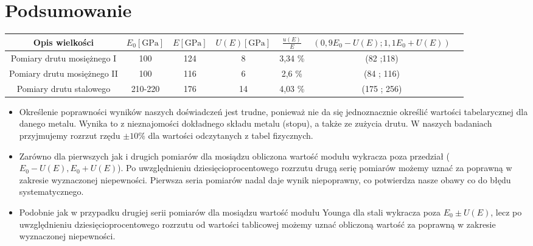 \documentclass [a4paper,11pt]{article}
\begin{document}
	
	
	\section{Podsumowanie}
	\begin{center}
		\begin{tabular}{|c|c|c|c|c|c|c|}
			\hline Opis wielkości & $ E_0 \left[ \text{GPa} \right]$ & $E \left[ \text{GPa} \right]$ & $U(E) \left[ \text{GPa} \right]$ & $ \frac{u(E)}{E} $& $(0,9E_0-U(E); 1,1E_0 + U(E))$\\
			\hline Pomiary drutu mosiężnego I & 100 & 124 & 8 & 3,34 \% & (82 ;118) \\
			\hline Pomiary drutu mosiężnego II & 100 & 116 & 6 & 2,6 \% & (84 ; 116) \\  
			\hline Pomiary drutu stalowego & 210-220 & 176  & 14 &  4,03 \% & (175 ; 256)\\ 
			\hline 
		\end{tabular} 
	\end{center}
\vspace{1em}

\begin{itemize}
	\item Określenie poprawności wyników naszych doświadczeń jest trudne, ponieważ nie da się jednoznacznie określić wartości tabelarycznej dla danego metalu. Wynika to z nieznajomości dokładnego składu metalu (stopu), a także ze zużycia drutu. W naszych badaniach przyjmujemy rozrzut rzędu $\pm10\%$ dla wartości odczytanych z tabel fizycznych.
	
	\item Zarówno dla pierwszych jak i drugich pomiarów dla mosiądzu obliczona wartość modułu wykracza poza przedział ($E_0-U(E), E_0+U(E)$). Po uwzględnieniu dziesięcioprocentowego rozrzutu drugą serię pomiarów możemy uznać za poprawną w zakresie wyznaczonej niepewności. Pierwsza seria pomiarów nadal daje wynik niepoprawny, co potwierdza nasze obawy co do błędu systematycznego.
	
	\item Podobnie jak w przypadku drugiej serii pomiarów dla mosiądzu wartość modułu Younga dla stali wykracza poza $E_0 \pm U(E)$, lecz po uwzględnieniu dziesięcioprocentowego rozrzutu od wartości tablicowej możemy uznać obliczoną wartość za poprawną w zakresie wyznaczonej niepewności.
	
\end{itemize}
\end{document}
